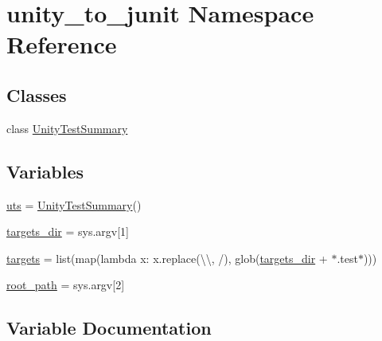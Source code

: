 \hypertarget{namespaceunity__to__junit}{}\section{unity\+\_\+to\+\_\+junit Namespace Reference}
\label{namespaceunity__to__junit}
\subsection*{Classes}
\begin{DoxyCompactItemize}
\item 
class \hyperlink{classunity__to__junit_1_1_unity_test_summary}{Unity\+Test\+Summary}
\end{DoxyCompactItemize}
\subsection*{Variables}
\begin{DoxyCompactItemize}
\item 
\hyperlink{namespaceunity__to__junit_a46316a5263d07e5ef88fa5eeef20f41b}{uts} = \hyperlink{classunity__to__junit_1_1_unity_test_summary}{Unity\+Test\+Summary}()
\item 
\hyperlink{namespaceunity__to__junit_a634333f9ba8cf5223dbef34ba1d02a6d}{targets\+\_\+dir} = sys.\+argv\mbox{[}1\mbox{]}
\item 
\hyperlink{namespaceunity__to__junit_af34ff74a0b45d670df96094c5a4a980f}{targets} = list(map(lambda x\+: x.\+replace(\textquotesingle{}\textbackslash{}\textbackslash{}\textquotesingle{}, \textquotesingle{}/\textquotesingle{}), glob(\hyperlink{namespaceunity__to__junit_a634333f9ba8cf5223dbef34ba1d02a6d}{targets\+\_\+dir} + \textquotesingle{}$\ast$.test$\ast$\textquotesingle{})))
\item 
\hyperlink{namespaceunity__to__junit_a57d0d9217ffa165c333a3f1630d48c1a}{root\+\_\+path} = sys.\+argv\mbox{[}2\mbox{]}
\end{DoxyCompactItemize}


\subsection{Variable Documentation}
\mbox{\label{namespaceunity__to__junit_a57d0d9217ffa165c333a3f1630d48c1a}} 
